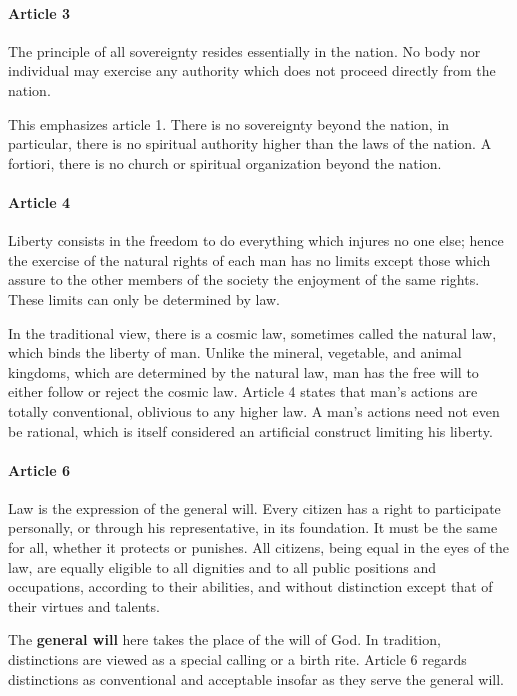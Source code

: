 \paragraph{Article 3}
\begin{quotex}
The principle of all sovereignty resides essentially in the nation. No body nor individual may exercise any authority which does not proceed directly from the nation. 

\end{quotex}
This emphasizes article 1. There is no sovereignty beyond the nation, in particular, there is no spiritual authority higher than the laws of the nation. A fortiori, there is no church or spiritual organization beyond the nation.

\paragraph{Article 4}
\begin{quotex}
Liberty consists in the freedom to do everything which injures no one else; hence the exercise of the natural rights of each man has no limits except those which assure to the other members of the society the enjoyment of the same rights. These limits can only be determined by law.

\end{quotex}
In the traditional view, there is a cosmic law, sometimes called the natural law, which binds the liberty of man. Unlike the mineral, vegetable, and animal kingdoms, which are determined by the natural law, man has the free will to either follow or reject the cosmic law. Article 4 states that man's actions are totally conventional, oblivious to any higher law. A man's actions need not even be rational, which is itself considered an artificial construct limiting his liberty.

\paragraph{Article 6}
\begin{quotex}
Law is the expression of the general will. Every citizen has a right to participate personally, or through his representative, in its foundation. It must be the same for all, whether it protects or punishes. All citizens, being equal in the eyes of the law, are equally eligible to all dignities and to all public positions and occupations, according to their abilities, and without distinction except that of their virtues and talents. 

\end{quotex}
The \textbf{general will} here takes the place of the will of God. In tradition, distinctions are viewed as a special calling or a birth rite. Article 6 regards distinctions as conventional and acceptable insofar as they serve the general will.

